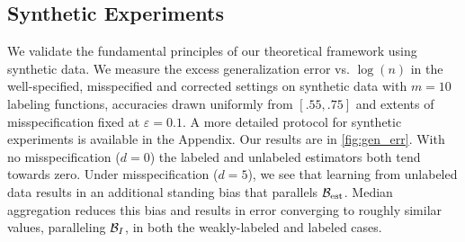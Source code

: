

\subsection{Synthetic Experiments}

We validate the fundamental principles of our theoretical framework using synthetic data. We measure the excess generalization error vs. $\log(n)$ in the well-specified, misspecified and corrected settings on synthetic data with $m=10$ labeling functions, accuracies drawn uniformly from $[.55, .75]$ and extents of misspecification fixed at $\varepsilon=0.1$. A more detailed protocol for synthetic experiments is available in the Appendix.
Our results are in \autoref{fig:gen_err}. With no misspecification ($d=0$) the labeled and unlabeled estimators both tend towards zero. Under misspecification ($d=5$), we see that learning from unlabeled data results in an additional standing bias that parallels $\mathcal{B}_{\mathrm{est}}$. Median aggregation reduces this bias and results in error converging to roughly similar values, paralleling $\mathcal{B}_I$, in both the weakly-labeled and labeled cases.

